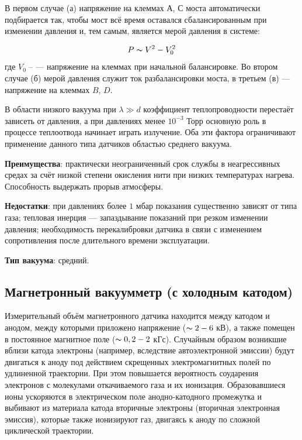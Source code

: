 \documentclass[a4paper,12pt]{article}
\begin{document}
В первом случае (а) напряжение на клеммах $А$, $С$ моста автоматически подбирается так, чтобы мост всё время оставался сбалансированным при изменении давления и, тем самым, является мерой давления в системе: 

\begin{equation}
	P \thicksim V^2 - V_{0}^2
\end{equation}
где $V_0$ -- — напряжение на клеммах при начальной балансировке.
Во втором случае (б) мерой давления служит ток разбалансировки моста, в третьем (в) — напряжение на клеммах $B$, $D$. 

В области низкого вакуума при $\lambda \gg d$ коэффициент теплопроводности перестаёт зависеть от давления, а при давлениях менее $10^{-3}$ Торр
основную роль в процессе теплоотвода начинает играть излучение. Оба эти фактора ограничивают применение данного типа датчиков областью среднего вакуума.

\textbf{Преимущества}: практически неограниченный срок службы
в неагрессивных средах за счёт низкой степени окисления нити
при низких температурах нагрева. Способность выдержать прорыв атмосферы.

\textbf{Недостатки}: при давлениях более $1$ мбар показания существенно
зависят от типа газа; тепловая инерция — запаздывание показаний при резком изменении давления; необходимость перекалибровки датчика в связи с изменением сопротивления после длительного времени эксплуатации.

\textbf{Тип вакуума}: средний.


\subsection{Магнетронный вакуумметр (с холодным катодом)}

Измерительный объём магнетронного датчика находится
между катодом и анодом, между которыми приложено напряжение
($\thicksim 2-6$ кВ), а также помещен в постоянное магнитное поле ($\thicksim 0,2-2$ кГс).
Случайным образом возникшие вблизи катода электроны (например,
вследствие автоэлектронной эмиссии) будут двигаться к аноду под действием скрещенных электромагнитных полей по удлиненной траектории. При этом повышается вероятность соударения электронов с молекулами откачиваемого газа и их ионизация. Образовавшиеся ионы ускоряются в электрическом поле анодно-катодного промежутка и выбивают из материала катода вторичные электроны (вторичная электронная эмиссия), которые также ионизируют газ, двигаясь к аноду по сложной циклической траектории.
\end{document}
